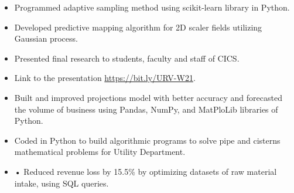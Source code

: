 \documentclass[10pt,a4paper]{altacv}
\begin{document}
\begin{itemize}
\item Programmed adaptive sampling method using scikit-learn library in Python. 
\item Developed predictive mapping algorithm for 2D scaler fields utilizing Gaussian process.
\item Presented final research to students, faculty and staff of CICS.
\item Link to the presentation \url{https://bit.ly/URV-W21}.


\end{itemize}
\divider

\begin{itemize}
\item Built and improved projections model with better accuracy and forecasted the volume of business using Pandas, NumPy, and MatPloLib libraries of Python. 
\item Coded in Python to build algorithmic programs to solve pipe and cisterns mathematical problems for Utility Department.
\item•	Reduced revenue loss by 15.5\% by optimizing datasets of raw material intake, using SQL queries.


\end{itemize}


\end{document}
